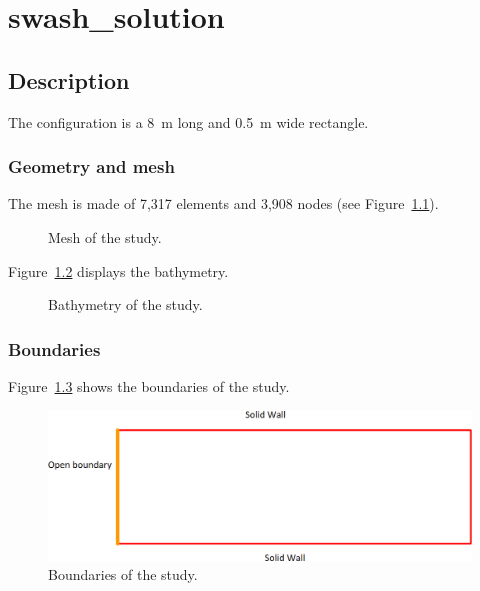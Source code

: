\chapter{swash\_solution}


\section{Description}

The configuration is a 8~m long and 0.5~m wide rectangle.

\subsection{Geometry and mesh}

The mesh is made of 7,317 elements and 3,908 nodes
(see Figure~\ref{fig:swash:mesh}).

\begin{figure}[H]
\centering
{}
\caption{Mesh of the study.}
\label{fig:swash:mesh}
\end{figure}

Figure~\ref{fig:swash:bathy} displays the bathymetry.

\begin{figure}[H]
\centering
{}
\caption{Bathymetry of the study.}
\label{fig:swash:bathy}
\end{figure}

\subsection{Boundaries}

Figure~\ref{fig:swash:boundaries} shows the boundaries of the study.

\begin{figure}[H]
\centering
\includegraphics[width=.9\textwidth]{img/boundaries.png}
\caption{Boundaries of the study.}
\label{fig:swash:boundaries}
\end{figure}


